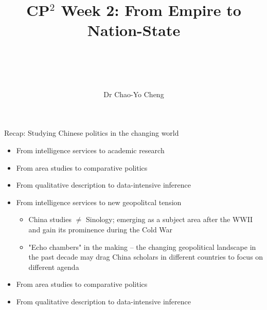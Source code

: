 \documentclass[
  10pt,
  ignorenonframetext,
]{beamer}
\title{\hfill\break
\hfill\break
CP\(^2\) Week 2: From Empire to Nation-State\\
\strut \\}
\author{Dr Chao-Yo Cheng\\}
\date{}
\begin{document}
\frame{\titlepage}

\begin{frame}{Recap: Studying Chinese politics in the changing world}
\label{recap-studying-chinese-politics-in-the-changing-world}
\begin{itemize}
  \item From intelligence services to academic research
  \vspace{0.5cm}
  \item From area studies to comparative politics
  \vspace{0.5cm}
  \item From qualitative description to data-intensive inference
\end{itemize}
\end{frame}

\begin{frame}
\begin{itemize}
  \item From intelligence services to new geopolitcal tension
  \vspace{0.1cm}
  \begin{itemize}
    \item China studies $\neq$ Sinology; emerging as a subject area after the WWII and gain its prominence during the Cold War
    \item "Echo chambers" in the making -- the changing geopolitical landscape in the past decade may drag China scholars in different countries to focus on different agenda
  \end{itemize}
  \vspace{0.3cm}
  \item From area studies to comparative politics
  \vspace{0.3cm}
  \item From qualitative description to data-intensive inference
\end{itemize}
\end{frame}
\end{document}
